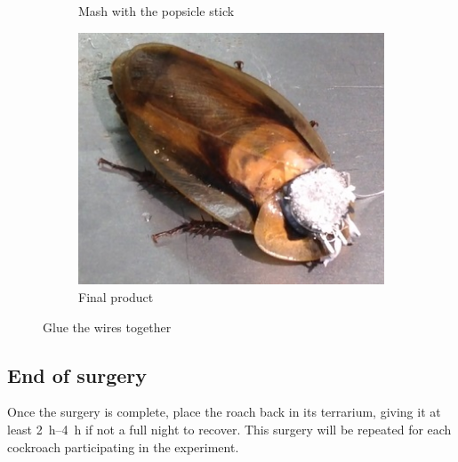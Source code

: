 \begin{figure}[ht!]
\begin{subfigure}{.49\textwidth}
    \caption{Mash with the popsicle stick}
    \label{fig:gluewires1}
    \end{subfigure}
    \begin{subfigure}{.49\textwidth}
    \centering
    \includegraphics[scale=0.4]{Surgery Photos/gluewires2.jpg}
    \caption{Final product}
    \label{fig:gluewires2}
    \end{subfigure}
\caption{Glue the wires together}
\label{fig:connectorC}
\end{figure}







\subsection{End of surgery}
Once the surgery is complete, place the roach back in its terrarium, giving it at least \SIrange{2}{4}{\hour} if not a full night to recover. This surgery will be repeated for each cockroach participating in the experiment.
